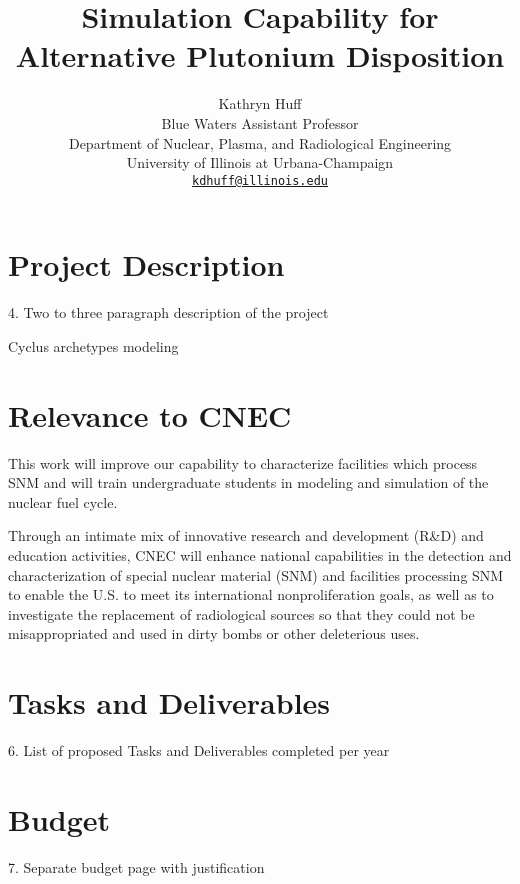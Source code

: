 \documentclass[letterpaper]{article}
\author{Kathryn Huff\\
        Blue Waters Assistant Professor\\
        Department of Nuclear, Plasma, and Radiological Engineering\\
        University of Illinois at Urbana-Champaign\\
         \href{mailto:kdhuff@illinois.edu}{\texttt{kdhuff@illinois.edu}}}
\title{Simulation Capability for Alternative Plutonium Disposition}
\begin{document}
\maketitle

\section{Project Description}
4. Two to three paragraph description of the project

Cyclus archetypes modeling 

\section{Relevance to CNEC}
This work will improve our capability to characterize facilities which process
\gls{SNM} and will train undergraduate students in modeling and simulation of
the nuclear fuel cycle. 


Through an intimate mix of innovative research and development (R&D) and education activities, CNEC will enhance national capabilities in the detection and characterization of special nuclear material (SNM) and facilities processing SNM to enable the U.S. to meet its international nonproliferation goals, as well as to investigate the replacement of radiological sources so that they could not be misappropriated and used in dirty bombs or other deleterious uses.

\section{Tasks and Deliverables}
6. List of proposed Tasks and Deliverables completed per year

\pagebreak
\section{Budget}
7. Separate budget page with justification



\end{document}
